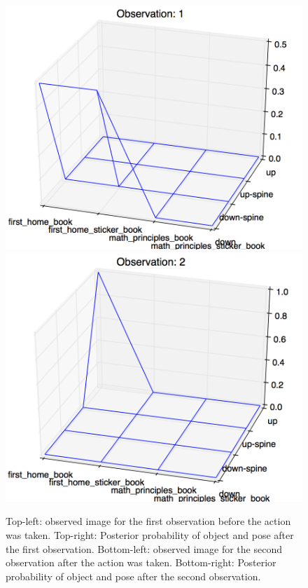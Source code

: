     \begin{figure}
    		\includegraphics[width = 0.6\columnwidth]{pics/experimentObs1.png}\\
    		\includegraphics[width = 0.6\columnwidth]{pics/experimentObs2.png}

	\caption{ Top-left: observed image for the first observation before the action was taken. Top-right: Posterior probability of object and pose after the first observation.	Bottom-left: observed image for the second observation after the action was taken. Bottom-right: Posterior probability of object and pose after the second observation.}
    	\label{fig:posteriors}
    \end{figure}

